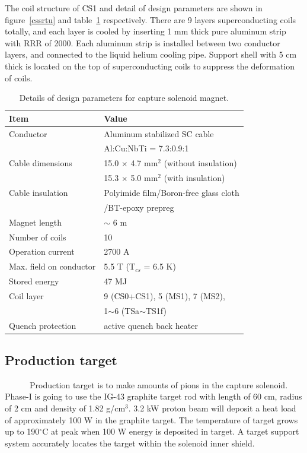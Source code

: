 The coil structure of CS1 and detail of design parameters are shown in figure~\ref{cssrtu} and table~\ref{desip} respectively.
There are 9 layers superconducting coils totally, and each layer is cooled by inserting 1 mm thick pure aluminum strip with RRR of 2000.
Each aluminum strip is installed between two conductor layers, and connected to the liquid helium cooling pipe.
Support shell with 5 cm thick is located on the top of superconducting coils to suppress the deformation of coils.
\begin{table}[H]
 \centering
 \begin{tabular}{ll} \hline \hline
  Item & Value \\ \hline
  Conductor & Aluminum stabilized SC cable \\
   & Al:Cu:NbTi = 7.3:0.9:1 \\
  Cable dimensions & 15.0 $\times$ 4.7 mm$^2$ (without insulation) \\
   & 15.3 $\times$ 5.0 mm$^2$ (with insulation) \\
  Cable insulation & Polyimide film/Boron-free glass cloth \\
   & /BT-epoxy prepreg \\
  Magnet length & $\sim$ 6 m \\
  Number of coils & 10 \\
  Operation current & 2700 A \\
  Max. field on conductor & 5.5 T (T$_{cs}$ = 6.5 K) \\
  Stored energy & 47 MJ \\
  Coil layer & 9 (CS0+CS1), 5 (MS1), 7 (MS2), \\
   & 1$\sim$6 (TSa$\sim$TS1f) \\
  Quench protection & active quench back heater \\ \hline \hline
 \end{tabular}
 \caption{Details of design parameters for capture solenoid magnet.}
 \label{desip}
\end{table}

\subsection{Production target}
~~~~~~Production target is to make amounts of pions in the capture solenoid.
Phase-I is going to use the IG-43 graphite target rod with length of 60 cm, radius of 2 cm and density of 1.82 g/cm$^3$.
3.2 kW proton beam will deposit a heat load of approximately 100 W in the graphite target.
The temperature of target grows up to 190$^{\circ}$C at peak when 100 W energy is deposited in target.
A target support system accurately locates the target within the solenoid inner shield.

